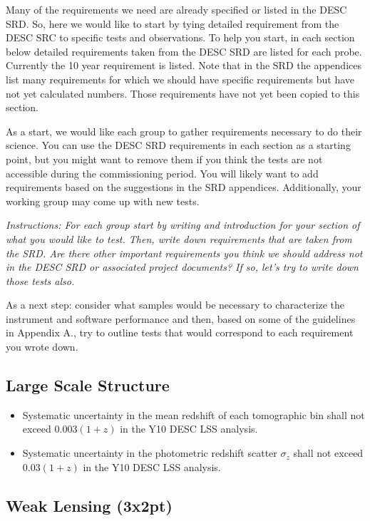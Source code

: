 \documentclass[modern]{desc-tex/styles/lsstdescnote}
\begin{document}
Many of the requirements we need are already specified or listed in the DESC SRD.  So, here we would like to start by tying detailed requirement from the DESC SRC to specific tests and observations. To help you start, in each section below detailed requirements taken from the DESC SRD are listed for each probe.  Currently the 10 year requirement is listed.  Note that in the SRD the appendices list many requirements for which we should have specific requirements but have not yet calculated numbers. Those requirements have not yet been copied to this section.

As a start, we would like each group to gather requirements necessary to do their science.  You can use the DESC SRD requirements in each section as a starting point, but you might want to remove them if you think the tests are not accessible during the commissioning period. You will likely want to add requirements based on the suggestions in the SRD appendices.  Additionally, your working group may come up with new tests.

{\it Instructions: For each group start by writing and introduction for your section of what you would like to test.  Then, write down requirements that are taken from the SRD.  Are there other important requirements you think we should address  not in the DESC SRD or associated project documents?  If so, let's try to write down those tests also.

As a next step: consider what samples would be necessary to characterize the instrument and software performance and then, based on some of the guidelines in Appendix A., try to outline tests that would correspond to each requirement you wrote down. }

\subsection{Large Scale Structure}

\begin{itemize}
\item Systematic uncertainty in the mean redshift of each tomographic bin shall not exceed $0.003 (1 + z)$ in the Y10 DESC LSS analysis.
\item Systematic uncertainty in the photometric redshift scatter $\sigma_z$ shall not exceed $0.03 (1 + z)$ in the Y10 DESC LSS analysis.
\end{itemize}

\subsection{Weak Lensing (3x2pt)}
\end{document}
